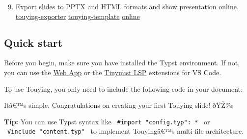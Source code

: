 \begin{enumerate}
\setcounter{enumi}{8}
\tightlist
\item
  Export slides to PPTX and HTML formats and show presentation online.
  \href{https://github.com/touying-typ/touying-exporter}{touying-exporter}
  \href{https://github.com/touying-typ/touying-template}{touying-template}
  \href{https://touying-typ.github.io/touying-template/}{online}
\end{enumerate}


\subsection{Quick start}\label{quick-start}

Before you begin, make sure you have installed the Typst environment. If
not, you can use the \href{https://typst.app/}{Web App} or the
\href{https://marketplace.visualstudio.com/items?itemName=myriad-dreamin.tinymist}{Tinymist
LSP} extensions for VS Code.

To use Touying, you only need to include the following code in your
document:

\begin{Shaded}
\begin{Highlighting}[]






\end{Highlighting}
\end{Shaded}


Itâ€™s simple. Congratulations on creating your first Touying slide!
ðŸŽ‰

\textbf{Tip:} You can use Typst syntax like
\texttt{\ \#import\ "config.typ":\ *\ } or
\texttt{\ \#include\ "content.typ"\ } to implement Touyingâ€™s
multi-file architecture.

